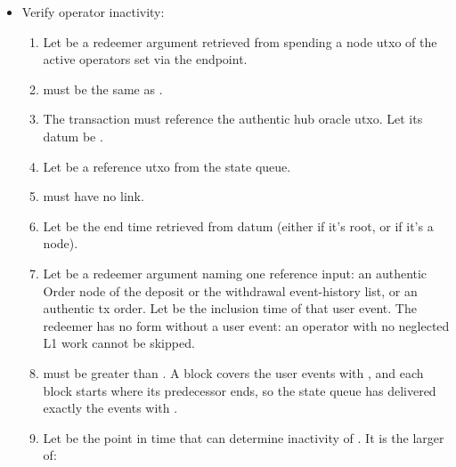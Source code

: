 \documentclass[../midgard.tex]{subfiles}
\begin{document}
\begin{description}
\begin{itemize}
          \begin{enumerate}
            \item Both  and  must have appointed operators.
              Let  and  be their operators, and  and  be their shift start times in order.
          \end{enumerate}
        \item Verify operator inactivity:
          \begin{enumerate}[resume]
            \item Let  be a redeemer argument retrieved from spending a node utxo of the active operators set via the  endpoint.
            \item {} must be the same as .
            \item The transaction must reference the authentic hub oracle utxo.
              Let its datum be .
            \item Let  be a reference utxo from the state queue.
            \item {} must have no link.
            \item Let  be the end time retrieved from  datum (either  if it's root, or  if it's a node).
            \item Let  be a redeemer argument naming one reference input: an authentic Order node of the deposit or the withdrawal event-history list, or an authentic tx order.
              Let  be the inclusion time of that user event.
              The redeemer has no form without a user event: an operator with no neglected L1 work cannot be skipped.
            \item {} must be greater than .
              A block covers the user events with , and each block starts where its predecessor ends, so the state queue has delivered exactly the events with .
            \item Let  be the point in time that can determine inactivity of .
              It is the larger of:
              \begin{itemize}

\end{itemize}
\end{enumerate}
\end{itemize}
\end{description}
\end{document}

